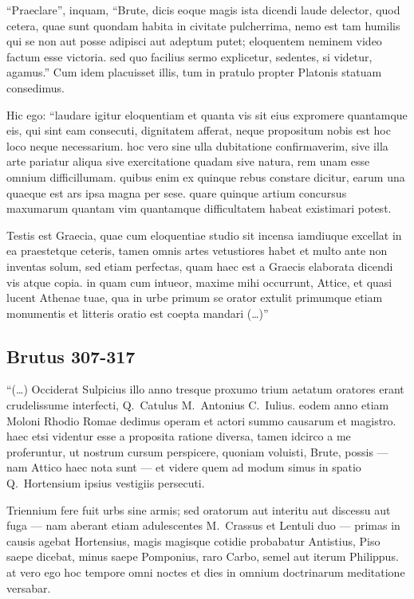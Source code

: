 ``Praeclare'', inquam, ``Brute, dicis eoque magis ista dicendi laude delector, quod cetera, quae sunt quondam habita in civitate pulcherrima, nemo est tam humilis qui se non aut posse adipisci aut adeptum putet; eloquentem neminem video factum esse victoria. sed quo facilius sermo explicetur, sedentes, si videtur, agamus.'' Cum idem placuisset illis, tum in pratulo propter Platonis statuam consedimus.

Hic ego: ``laudare igitur eloquentiam et quanta vis sit eius expromere quantamque eis, qui sint eam consecuti, dignitatem afferat, neque propositum nobis est hoc loco neque necessarium. hoc vero sine ulla dubitatione confirmaverim, sive illa arte pariatur aliqua sive exercitatione quadam sive natura, rem unam esse omnium difficillumam. quibus enim ex quinque rebus constare dicitur, earum una quaeque est ars ipsa magna per sese. quare quinque artium concursus maxumarum quantam vim quantamque difficultatem habeat existimari potest.

Testis est Graecia, quae cum eloquentiae studio sit incensa iamdiuque excellat in ea praestetque ceteris, tamen omnis artes vetustiores habet et multo ante non inventas solum, sed etiam perfectas, quam haec est a Graecis elaborata dicendi vis atque copia. in quam cum intueor, maxime mihi occurrunt, Attice, et quasi lucent Athenae tuae, qua in urbe primum se orator extulit primumque etiam monumentis et litteris oratio est coepta mandari (\dots)''

\subsection*{Brutus 307-317}

``(\dots) Occiderat Sulpicius illo anno tresque proxumo trium aetatum oratores erant crudelissume interfecti, Q.~Catulus M.~Antonius C.~Iulius. eodem anno etiam Moloni Rhodio Romae dedimus operam et actori summo causarum et magistro. haec etsi videntur esse a proposita ratione diversa, tamen idcirco a me proferuntur, ut nostrum cursum perspicere, quoniam voluisti, Brute, possis — nam Attico haec nota sunt — et videre quem ad modum simus in spatio Q.~Hortensium ipsius vestigiis persecuti.

Triennium fere fuit urbs sine armis; sed oratorum aut interitu aut discessu aut fuga — nam aberant etiam adulescentes M.~Crassus et Lentuli duo — primas in causis agebat Hortensius, magis magisque cotidie probabatur Antistius, Piso saepe dicebat, minus saepe Pomponius, raro Carbo, semel aut iterum Philippus. at vero ego hoc tempore omni noctes et dies in omnium doctrinarum meditatione versabar.

